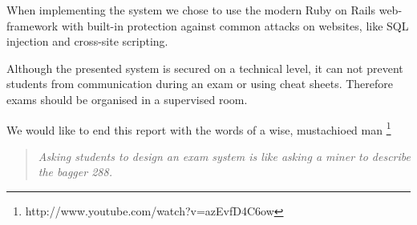 \documentclass[12pt]{article}
\begin{document}
When implementing the system we chose to use the modern Ruby on Rails
web-framework with built-in protection against common attacks on websites,
like SQL injection and cross-site scripting.

Although the presented system is secured on a technical level, it can not
prevent students from communication during an exam or using cheat sheets.
Therefore exams should be organised in a supervised room.

We would like to end this report with the words of a wise, mustachioed man
\footnote{http://www.youtube.com/watch?v=azEvfD4C6ow}
\begin{quote}
\textit{Asking students to design an exam system is like asking a miner to
describe the bagger 288.}
\end{quote}
\end{document}
